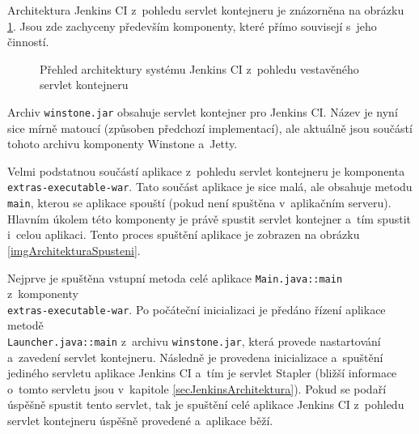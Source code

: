             Architektura Jenkins CI z~pohledu servlet kontejneru je znázorněna na obrázku \ref{imgArchitekturaServlet}.
            Jsou zde zachyceny především komponenty, které přímo souvisejí s~jeho činností.

            \begin{figure}[h!t]
                \begin{center}
                    \caption{Přehled architektury systému Jenkins CI z~pohledu vestavěného servlet kontejneru}
                    \label{imgArchitekturaServlet}
                \end{center}
            \end{figure}

            
            Archiv \texttt{winstone.jar} obsahuje servlet kontejner pro Jenkins CI. Název je nyní sice mírně matoucí
            (způsoben předchozí implementací), ale aktuálně jsou součástí tohoto archivu komponenty Winstone a~Jetty.

            Velmi podstatnou součástí aplikace z~pohledu servlet kontejneru je komponenta\\\texttt{extras-executable-war}. 
            Tato součást aplikace je sice malá, ale obsahuje metodu \texttt{main}, kterou se aplikace spouští 
            (pokud není spuštěna v~aplikačním serveru). Hlavním úkolem této komponenty je právě spustit 
            servlet kontejner a~tím spustit i~celou aplikaci. Tento proces spuštění aplikace je zobrazen
            na obrázku \ref{imgArchitekturaSpusteni}.

            Nejprve je spuštěna vstupní metoda celé aplikace \texttt{Main.java::main} z~komponenty\\\texttt{extras-executable-war}.
            Po počáteční inicializaci je předáno řízení aplikace metodě \\\texttt{Launcher.java::main}
            z~archivu \texttt{winstone.jar}, která provede nastartování
            a~zavedení servlet kontejneru. Následně je provedena inicializace a~spuštění
            jediného servletu aplikace Jenkins CI a~tím je servlet Stapler (bližší informace o~tomto
            servletu jsou v~kapitole \ref{secJenkinsArchitektura}). 
            Pokud se podaří úspěšně spustit tento servlet, tak je spuštění celé aplikace Jenkins CI z~pohledu
            servlet kontejneru úspěšně provedené a~aplikace běží.

